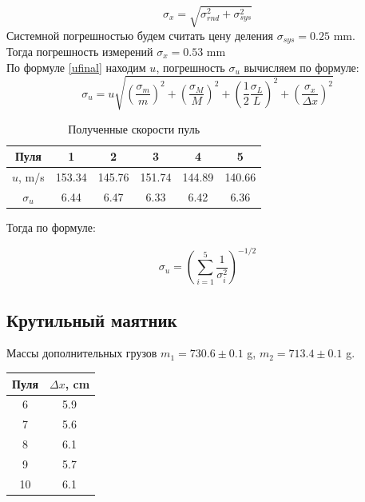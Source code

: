 \documentclass[a4paper,12pt]{article}
\begin{document}
	\begin{equation}
		\label{sigmax1}
		\sigma_x=\sqrt{\sigma_{rnd}^2+\sigma_{sys}^2}
	\end{equation}
	Системной погрешностью будем считать цену деления $\sigma_{sys}=0.25$ mm.\\
	
	Тогда погрешность измерений $\sigma_x = 0.53$ mm\\
	
	По формуле \eqref{ufinal} находим $u$, погрешность $\sigma_u$ вычисляем по формуле:
	\begin{equation}
		\label{sigmau1}
		\sigma_u = u\sqrt{\left(\frac{\sigma_m}{m}\right)^2+\left(\frac{\sigma_M}{M}\right)^2+\left(\frac{1}{2}\frac{\sigma_
				L}{L}\right)^2+\left(\frac{\sigma_x}{\Delta x}\right)^2}
	\end{equation}
	
	\begin{table}[H]
		\centering
		\begin{tabular}{|c|c|c|c|c|c|}
			\hline
			Пуля & 1 & 2 & 3 & 4 & 5 \\
			\hline
			$u$, m/s & 153.34 & 145.76 & 151.74 & 144.89 & 140.66 \\
			\hline
			$\sigma_u$ & 6.44 & 6.47 & 6.33 & 6.42 & 6.36 \\
			\hline
		\end{tabular}
		\caption{Полученные скорости пуль}
	\end{table}
	
	Тогда по формуле:
	
	\begin{equation}
		\label{chisigma}
		\sigma_u=\left(\sum_{i=1}^{5}\frac{1}{\sigma_i^2}\right)^{-1/2}
	\end{equation}
	
	\begin{center}
	\end{center}
	
	
	\subsection{Крутильный маятник}
	
	Массы дополнительных грузов $m_1=730.6\pm 0.1$ g, $m_2=713.4\pm 0.1$ g.\\
	
	\begin{table}[H]
		\centering
		\begin{tabular}{|c|c|}
			\hline
			Пуля & $\Delta x$, cm \\
			\hline
			6 & 5.9 \\
			\hline
			7 & 5.6 \\
			\hline
			8 & 6.1 \\
			\hline
			9 & 5.7 \\
			\hline
			10 & 6.1 \\
			\hline
		\end{tabular}
	\end{table}
	
\end{document}

